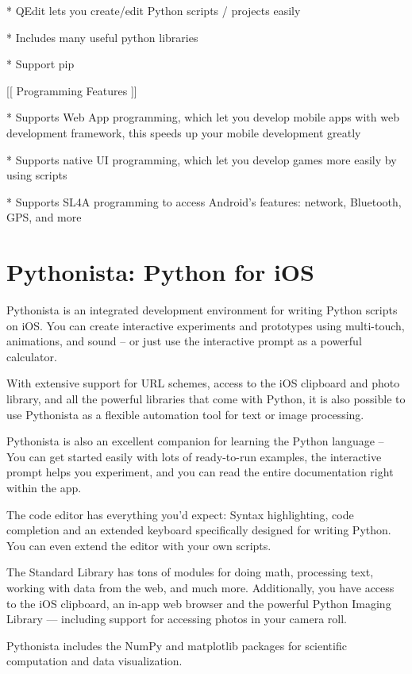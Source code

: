 * QEdit lets you create/edit Python scripts / projects easily 

* Includes many useful python libraries 

* Support pip 

[[ Programming Features ]] 

* Supports Web App programming, which let you develop mobile apps with web development framework, this speeds up your mobile development greatly 

* Supports native UI programming, which let you develop games more easily by using scripts 

* Supports SL4A programming to access Android’s features: network, Bluetooth, GPS, and more



\newpage
\section{Pythonista: Python for iOS}

Pythonista is an integrated development environment for writing Python scripts on iOS. You can create interactive experiments and prototypes using multi-touch, animations, and sound – or just use the interactive prompt as a powerful calculator.

With extensive support for URL schemes, access to the iOS clipboard and photo library, and all the powerful libraries that come with Python, it is also possible to use Pythonista as a flexible automation tool for text or image processing.

Pythonista is also an excellent companion for learning the Python language – You can get started easily with lots of ready-to-run examples, the interactive prompt helps you experiment, and you can read the entire documentation right within the app.

The code editor has everything you'd expect: Syntax highlighting, code completion and an extended keyboard specifically designed for writing Python. You can even extend the editor with your own scripts.

The Standard Library has tons of modules for doing math, processing text, working with data from the web, and much more. Additionally, you have access to the iOS clipboard, an in-app web browser and the powerful Python Imaging Library — including support for accessing photos in your camera roll.

Pythonista includes the NumPy and matplotlib packages for scientific computation and data visualization. 

